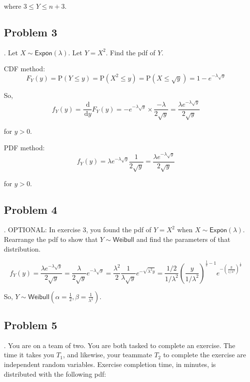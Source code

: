\documentclass[
]{book}
\begin{document}
where \(3\leq Y \leq n+3\).

\hypertarget{problem-3-11}{%
\subsection{Problem 3}\label{problem-3-11}}

. Let \(X\sim \textsf{Expon}(\lambda)\). Let \(Y=X^2\). Find the pdf of \(Y\).

CDF method:
\[
F_Y(y)=\mbox{P}(Y\leq y)=\mbox{P}(X^2\leq y)=\mbox{P}(X\leq \sqrt y)=1-e^{-\lambda \sqrt y}
\]

So,
\[
f_Y(y)=\frac{\,\mathrm{d}}{\,\mathrm{d}y}F_Y(y)=-e^{-\lambda \sqrt y}\times\frac{-\lambda}{2\sqrt y}=\frac{\lambda e^{-\lambda \sqrt y}}{2\sqrt y}
\]

for \(y >0\).

PDF method:
\[
f_Y(y)=\lambda e^{-\lambda \sqrt{y}}\frac{1}{2\sqrt y}=\frac{\lambda e^{-\lambda \sqrt y}}{2\sqrt y}
\]

for \(y>0\).

\hypertarget{problem-4-7}{%
\subsection{Problem 4}\label{problem-4-7}}

. OPTIONAL: In exercise 3, you found the pdf of \(Y=X^2\) when \(X\sim \textsf{Expon}(\lambda)\). Rearrange the pdf to show that \(Y\sim \textsf{Weibull}\) and find the parameters of that distribution.

\[
f_Y(y)=\frac{\lambda e^{-\lambda \sqrt y}}{2\sqrt y}=\frac{\lambda}{2\sqrt y}e^{-\lambda \sqrt y}=\frac{\lambda^2}{2} \frac{1}{\lambda\sqrt y} e^{-\sqrt{\lambda^2 y}}=\frac{1/2}{1/\lambda^2}\left(\frac{y}{1/\lambda^2}\right)^{\frac{1}{2}-1}e^{-\left(\frac{y}{1/\lambda^2}\right)^{\frac{1}{2}}}
\]

So, \(Y\sim \textsf{Weibull}\left(\alpha=\frac{1}{2},\beta=\frac{1}{\lambda^2}\right)\).

\hypertarget{problem-5-5}{%
\subsection{Problem 5}\label{problem-5-5}}

. You are on a team of two. You are both tasked to complete an exercise. The time it takes you \(T_1\), and likewise, your teammate \(T_2\) to complete the exercise are independent random variables. Exercise completion time, in minutes, is distributed with the following pdf:
\end{document}

